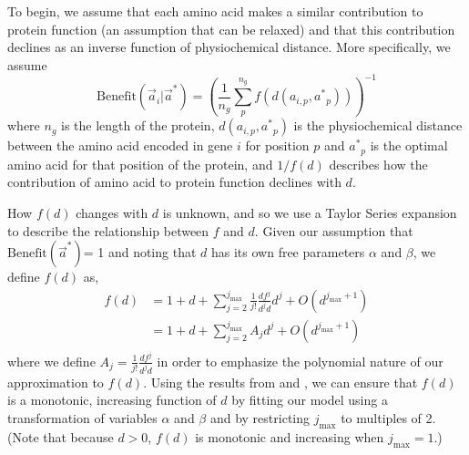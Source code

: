 \documentclass{article}
\newcommand{\jmax}{\ensuremath{{j_{\max}}}\xspace}
\newcommand{\aip}{\ensuremath{a_{i,p}}\xspace}
\newcommand{\aveci}{\ensuremath{\Vec{a}_i}\xspace}
\newcommand{\aopt}{\ensuremath{a^*}\xspace}
\newcommand{\aoptp}{\ensuremath{\aopt_p}\xspace}
\newcommand{\aoptvec}{\ensuremath{\Vec{a}^*}\xspace}
\newcommand{\Func}{\ensuremath{\text{Benefit}}\xspace}
\newcommand{\Funcaveci}{\ensuremath{\Func(\aveci|\aoptvec)}\xspace}
\newcommand{\Funcaoptvec}{\ensuremath{\Func(\aoptvec)}\xspace}
\renewcommand{\ng}{\ensuremath{{n_g}}\xspace}
\begin{document}
To begin, we assume that each amino acid makes a similar contribution to protein function (an assumption that can be relaxed) and that this contribution declines as an inverse function of physiochemical distance.
More specifically, we assume 
\begin{equation}
\Funcaveci = \left(\frac{1}{\ng} \sum_p^\ng{} f\left(d\left(\aip, \aoptp\right)\right)\right)^{-1}
\end{equation}
where $\ng$ is the length of the protein, $d(\aip, \aoptp)$ is the physiochemical distance between the amino acid encoded in gene $i$ for position $p$ and $\aoptp$ is the optimal amino acid for that position of the protein, and $1/f(d)$ describes how the contribution of amino acid to protein function declines with $d$.

How $f(d)$ changes with $d$ is unknown, and so we use a Taylor Series expansion to describe the relationship between $f$ and $d$.
Given our assumption that \Funcaoptvec = 1 and noting that $d$ has its own free parameters $\alpha$ and $\beta$, we define $f(d)$ as,
\begin{align}
  \label{eq:fSeriesDef}
  f(d) &= 1 + d + \sum_{j=2}^\jmax \frac{1}{j!}\frac{d f^j}{d^j d} d^j + O(d^{\jmax+1})\\
  & = 1 + d + \sum_{j=2}^\jmax A_j d^j + O(d^{\jmax+1})\\
\end{align}
where we define $A_j = \frac{1}{j!}\frac{d f^j}{d^j d}$ in order to emphasize the polynomial nature of our approximation to $f(d)$.
Using the results from \citet{Liang07} and \citet{Elphinstone85}, we can ensure that $f(d)$ is a monotonic, increasing function of $d$ by fitting our model using a transformation of variables $\alpha$ and $\beta$ and by restricting \jmax to multiples of 2. (Note that because $d > 0$, $f(d)$ is monotonic and increasing when $\jmax=1$.)
\end{document}
